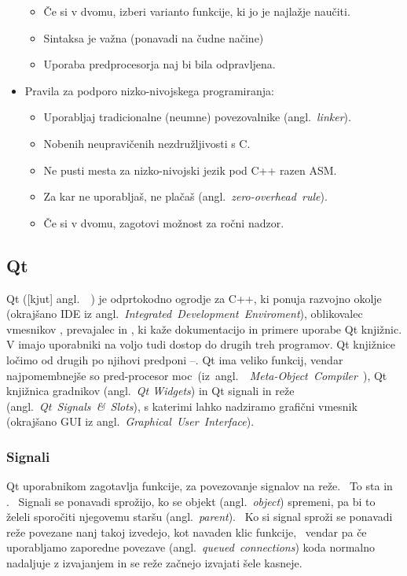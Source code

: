 \documentclass[12pt]{report}
\newcommand{\anglimp}[1]{angl.~\emph{#1}}
\newcommand{\angl}[1]{(\anglimp{#1})}
\newcommand{\codequote}[1]{\textquote{\texttt{#1}}}
\newcommand{\angokr}[2]{(okrajšano #1 iz \anglimp{#2})}
\begin{document}
\begin{itemize}
\begin{itemize}
						\item Če si v dvomu, izberi varianto funkcije, ki jo je najlažje naučiti. %
						\item Sintaksa je važna (ponavadi na čudne načine)
						\item Uporaba predprocesorja naj bi bila odpravljena.
					\end{itemize}
					\item Pravila za podporo nizko-nivojskega programiranja:~\cite{cpp_evolution}
					\begin{itemize}
						\item Uporabljaj tradicionalne (neumne) povezovalnike \angl{linker}.
						\item Nobenih neupravičenih nezdružljivosti s C.
						\item Ne pusti mesta za nizko-nivojski jezik pod C++ razen ASM.
						\item Za kar ne uporabljaš, ne plačaš \angl{zero-overhead~rule}.
						\item Če si v dvomu, zagotovi možnost za ročni nadzor.
					\end{itemize}
				\end{itemize}
		\subsection{Qt}
			Qt ([kjut] \anglimp{}~\cite{qt_pron}) je odprtokodno ogrodje za C++, ki ponuja razvojno okolje  \angokr{IDE}{Integrated~Development~Enviroment}, oblikovalec vmesnikov , prevajalec  in , ki kaže dokumentacijo in primere uporabe Qt knjižnic.
			V  imajo uporabniki na voljo tudi dostop do drugih treh programov.
			Qt knjižnice ločimo od drugih po njihovi predponi --.
			Qt ima veliko funkcij, vendar najpomembnejše so pred-procesor moc~(iz~\anglimp{~Meta-Object~Compiler}~\cite{qt_moc}), Qt knjižnica gradnikov \angl{Qt Widgets} in Qt signali in reže \angl{Qt~Signals~\&~Slots}, s katerimi lahko nadziramo grafični vmesnik \angokr{GUI}{Graphical~User~Interface}.
			\subsubsection{Signali}
				Qt uporabnikom zagotavlja funkcije, za povezovanje signalov na reže.~\cite{qt_signals} To sta \codequote{connect} in \codequote{disconnect}.~\cite{qt_signals}
				Signali se ponavadi sprožijo, ko se objekt \angl{object} spremeni, pa bi to želeli sporočiti njegovemu staršu \angl{parent}.~\cite{qt_signals}
				Ko si signal sproži se ponavadi reže povezane nanj takoj izvedejo, kot navaden klic funkcije,~\cite{qt_signals}
				vendar pa če uporabljamo zaporedne povezave \angl{queued~connections} koda normalno nadaljuje z izvajanjem in se reže začnejo izvajati šele kasneje.~\cite{qt_signals}
\end{document}
